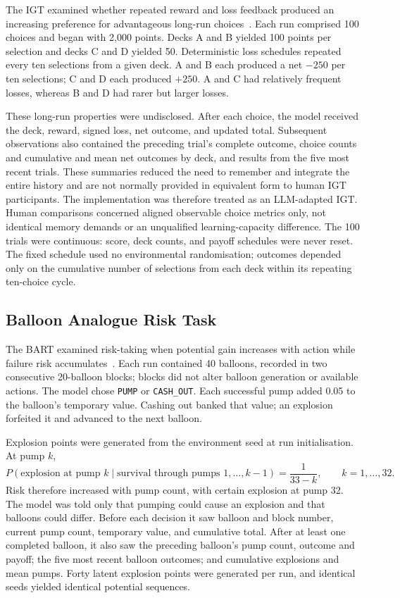 \documentclass[logo,msc]{infthesis}
\begin{document}
The IGT examined whether repeated reward and loss feedback produced an increasing preference for advantageous long-run choices~\cite{Bechara1994}. Each run comprised 100 choices and began with 2,000 points. Decks A and B yielded 100 points per selection and decks C and D yielded 50. Deterministic loss schedules repeated every ten selections from a given deck. A and B each produced a net $-250$ per ten selections; C and D each produced $+250$. A and C had relatively frequent losses, whereas B and D had rarer but larger losses.

These long-run properties were undisclosed. After each choice, the model received the deck, reward, signed loss, net outcome, and updated total. Subsequent observations also contained the preceding trial's complete outcome, choice counts and cumulative and mean net outcomes by deck, and results from the five most recent trials. These summaries reduced the need to remember and integrate the entire history and are not normally provided in equivalent form to human IGT participants. The implementation was therefore treated as an LLM-adapted IGT. Human comparisons concerned aligned observable choice metrics only, not identical memory demands or an unqualified learning-capacity difference. The 100 trials were continuous: score, deck counts, and payoff schedules were never reset. The fixed schedule used no environmental randomisation; outcomes depended only on the cumulative number of selections from each deck within its repeating ten-choice cycle.

\subsection{Balloon Analogue Risk Task}

The BART examined risk-taking when potential gain increases with action while failure risk accumulates~\cite{Lejuez2002}. Each run contained 40 balloons, recorded in two consecutive 20-balloon blocks; blocks did not alter balloon generation or available actions. The model chose \texttt{PUMP} or \texttt{CASH\_OUT}. Each successful pump added 0.05 to the balloon's temporary value. Cashing out banked that value; an explosion forfeited it and advanced to the next balloon.

Explosion points were generated from the environment seed at run initialisation. At pump $k$,
\[
P(\text{explosion at pump }k\mid\text{survival through pumps }1,\ldots,k-1)=\frac{1}{33-k},\qquad k=1,\ldots,32.
\]
Risk therefore increased with pump count, with certain explosion at pump 32. The model was told only that pumping could cause an explosion and that balloons could differ. Before each decision it saw balloon and block number, current pump count, temporary value, and cumulative total. After at least one completed balloon, it also saw the preceding balloon's pump count, outcome and payoff; the five most recent balloon outcomes; and cumulative explosions and mean pumps. Forty latent explosion points were generated per run, and identical seeds yielded identical potential sequences.
\end{document}
